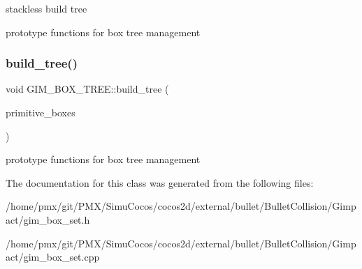 stackless build tree 

prototype functions for box tree management \mbox{\label{classGIM__BOX__TREE_af76fa1d2f5e20c8979120fa72cf7575f}} 
\subsubsection{\texorpdfstring{build\+\_\+tree()}{build\_tree()}\hspace{0.1cm}{\footnotesize\ttfamily [2/2]}}
{\footnotesize\ttfamily void G\+I\+M\+\_\+\+B\+O\+X\+\_\+\+T\+R\+E\+E\+::build\+\_\+tree (\begin{DoxyParamCaption}\item[{\hyperlink{classgim__array}{gim\+\_\+array}$<$ \hyperlink{structGIM__AABB__DATA}{G\+I\+M\+\_\+\+A\+A\+B\+B\+\_\+\+D\+A\+TA} $>$ \&}]{primitive\+\_\+boxes }\end{DoxyParamCaption})}

prototype functions for box tree management 

The documentation for this class was generated from the following files\+:\begin{DoxyCompactItemize}
\item 
/home/pmx/git/\+P\+M\+X/\+Simu\+Cocos/cocos2d/external/bullet/\+Bullet\+Collision/\+Gimpact/gim\+\_\+box\+\_\+set.\+h\item 
/home/pmx/git/\+P\+M\+X/\+Simu\+Cocos/cocos2d/external/bullet/\+Bullet\+Collision/\+Gimpact/gim\+\_\+box\+\_\+set.\+cpp\end{DoxyCompactItemize}
